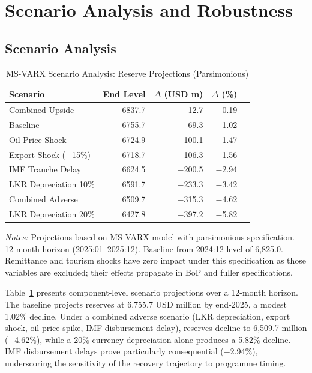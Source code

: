 \documentclass[12pt,a4paper]{article}
\begin{document}
\section{Scenario Analysis and Robustness}

\subsection{Scenario Analysis}

\begin{table}[htbp]
\centering
\caption{MS-VARX Scenario Analysis: Reserve Projections (Parsimonious)}
\label{tab:scenarios}
\begin{tabular}{lrrrr}
\toprule
Scenario & End Level & $\Delta$ (USD m) & $\Delta$ (\%) \\
\midrule
Combined Upside & 6837.7 & 12.7 & 0.19 \\
Baseline & 6755.7 & $-$69.3 & $-$1.02 \\
Oil Price Shock & 6724.9 & $-$100.1 & $-$1.47 \\
Export Shock ($-$15\%) & 6718.7 & $-$106.3 & $-$1.56 \\
IMF Tranche Delay & 6624.5 & $-$200.5 & $-$2.94 \\
LKR Depreciation 10\% & 6591.7 & $-$233.3 & $-$3.42 \\
Combined Adverse & 6509.7 & $-$315.3 & $-$4.62 \\
LKR Depreciation 20\% & 6427.8 & $-$397.2 & $-$5.82 \\
\bottomrule
\end{tabular}
\begin{tablenotes}
\small
\item \textit{Notes:} Projections based on MS-VARX model with parsimonious specification. 12-month horizon (2025:01--2025:12). Baseline from 2024:12 level of 6,825.0. Remittance and tourism shocks have zero impact under this specification as those variables are excluded; their effects propagate in BoP and fuller specifications.
\end{tablenotes}
\end{table}

Table~\ref{tab:scenarios} presents component-level scenario projections over a 12-month horizon. The baseline projects reserves at 6,755.7 USD million by end-2025, a modest 1.02\% decline. Under a combined adverse scenario (LKR depreciation, export shock, oil price spike, IMF disbursement delay), reserves decline to 6,509.7 million ($-$4.62\%), while a 20\% currency depreciation alone produces a 5.82\% decline. IMF disbursement delays prove particularly consequential ($-$2.94\%), underscoring the sensitivity of the recovery trajectory to programme timing.
\end{document}
